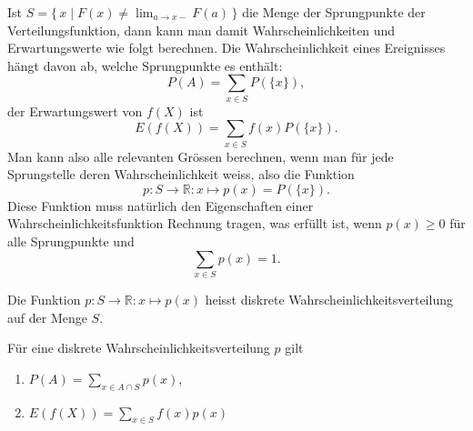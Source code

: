Ist $S=\{\,x\;|\;F(x)\ne \lim_{a\to x-}F(a)\,\}$ die Menge der Sprungpunkte 
der Verteilungsfunktion, dann kann man damit Wahrscheinlichkeiten und
Erwartungswerte wie folgt berechnen.
Die Wahrscheinlichkeit eines
Ereignisses hängt davon ab, welche Sprungpunkte es enthält:
\[
P(A)=\sum_{x\in S}P(\{x\}),
\]
der Erwartungswert von $f(X)$ ist
\[
E(f(X))=\sum_{x\in S}f(x)P(\{x\}).
\]
Man kann also alle relevanten Grössen berechnen, wenn man für jede
Sprungstelle deren Wahrscheinlichkeit weiss, also die Funktion
\[
p\colon S\to\mathbb{R}:x\mapsto p(x)=P(\{x\}).
\]
Diese Funktion muss natürlich den Eigenschaften einer
Wahrscheinlichkeitsfunktion Rechnung tragen, was erfüllt ist, wenn
$p(x)\ge 0$ für alle Sprungpunkte und 
\[
\sum_{x\in S}p(x)=1.
\]
\begin{definition}Die Funktion $p\colon S\to\mathbb{R}:x\mapsto p(x)$
heisst diskrete Wahrscheinlichkeitsverteilung auf der Menge $S$.
\end{definition}
\begin{satz}Für eine diskrete Wahrscheinlichkeitsverteilung $p$ gilt
\begin{enumerate}
\item $\displaystyle P(A)=\sum_{x\in A\cap S}p(x)$,
\item $\displaystyle E(f(X))=\sum_{x\in S}f(x)p(x)$
\end{enumerate}
\end{satz}

